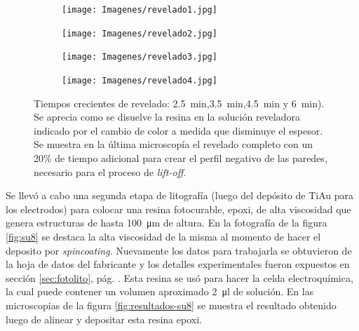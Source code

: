  				\begin{figure}[h!]
			 	   	    \centering
			 	   	    \begin{subfigure}[t]{0.495\textwidth}
			        	\texttt{[image: Imagenes/revelado1.jpg]}
			       		\end{subfigure}
			     		\begin{subfigure}[t]{0.495\textwidth}
			     		\texttt{[image: Imagenes/revelado2.jpg]}
			    		\end{subfigure}
			     		\begin{subfigure}[t]{0.495\textwidth}
						\vspace*{-0.3cm}
			     		\texttt{[image: Imagenes/revelado3.jpg]}
			        	\end{subfigure}
						\begin{subfigure}[t]{0.495\textwidth}
			     		\vspace*{-0.3cm}
			     		\texttt{[image: Imagenes/revelado4.jpg]}
			        	\end{subfigure}
			     		\caption[Revelado en función del tiempo]{Tiempos crecientes de revelado: \SI{2.5}{min},\SI{3.5}{min},\SI{4.5}{min} y \SI{6}{min}). Se aprecia como se disuelve la resina en la solución reveladora indicado por el cambio de color a medida que disminuye el espesor. Se muestra en la última microscopía el revelado completo con un 20\% de tiempo adicional para crear el perfil negativo de las paredes, necesario para el proceso de\textit{ lift-off}.}
			     		\label{fig:revelado}
			     	   	\end{figure}

			  \vspace*{2mm}Se llevó a cabo una segunda etapa de litografía (luego del depósito de Ti\textbar Au para los electrodos) para colocar una resina fotocurable, epoxi, de alta viscosidad que genera estructuras de hasta \SI{100}{\um} de altura. En la fotografía de la figura \ref{fig:su8} se destaca la alta viscosidad de la misma al momento de hacer el deposito por \textit{spincoating}. Nuevamente los datos para trabajarla se obtuvieron de la hoja de datos del fabricante\cite{Su8,Microchemicals2014} y los detalles experimentales fueron expuestos en  sección \ref{sec:fotolito}, pág. \pageref{sec:fotolito}. Esta resina se usó para hacer la celda electroquímica, la cual puede contener un volumen aproximado \SI{2}{\ul} de solución. En las microscopias de la figura \ref{fig:resultados-su8} se muestra el resultado obtenido luego de alinear y depositar esta resina epoxi.

